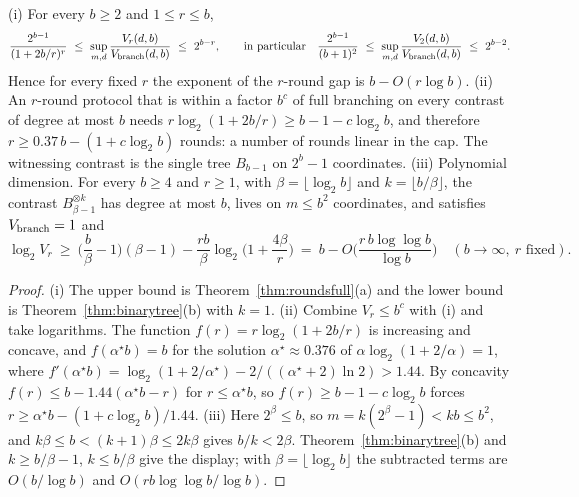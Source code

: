 \begin{corollary}\label{cor:fewrounds}
\textup{(i)} For every $b\ge2$ and $1\le r\le b$,
\[
 \frac{2^{b-1}}{(1+2b/r)^{r}}\ \le\ \sup_{m,d}\frac{V_r(d,b)}{V_{\rm branch}(d,b)}\ \le\ 2^{b-r},
 \qquad\text{in particular}\quad
 \frac{2^{b-1}}{(b+1)^2}\ \le\ \sup_{m,d}\frac{V_2(d,b)}{V_{\rm branch}(d,b)}\ \le\ 2^{b-2}.
\]
Hence for every fixed $r$ the exponent of the $r$-round gap is $b-O(r\log b)$.
\textup{(ii)} An $r$-round protocol that is within a factor $b^{c}$ of full
branching on every contrast of degree at most $b$ needs
$r\log_2(1+2b/r)\ge b-1-c\log_2b$, and therefore $r\ge0.37\,b-(1+c\log_2b)$
rounds: a number of rounds linear in the cap. The witnessing contrast is the
single tree $B_{b-1}$ on $2^b-1$ coordinates.
\textup{(iii)} Polynomial dimension. For every $b\ge4$ and $r\ge1$, with
$\beta=\lfloor\log_2b\rfloor$ and $k=\lfloor b/\beta\rfloor$, the contrast
$B_{\beta-1}^{\otimes k}$ has degree at most $b$, lives on $m\le b^2$
coordinates, and satisfies $V_{\rm branch}=1$ and
\[
 \log_2V_r\ \ge\ \Big(\frac b\beta-1\Big)(\beta-1)-\frac{rb}{\beta}\log_2\Big(1+\frac{4\beta}{r}\Big)
 \ =\ b-O\Big(\frac{r\,b\log\log b}{\log b}\Big)\quad(b\to\infty,\ r\text{ fixed}).
\]
\end{corollary}
\begin{proof}
(i) The upper bound is Theorem~\ref{thm:roundsfull}(a) and the lower bound is
Theorem~\ref{thm:binarytree}(b) with $k=1$. (ii) Combine $V_r\le b^c$ with
(i) and take logarithms. The function $f(r)=r\log_2(1+2b/r)$ is increasing
and concave, and $f(\alpha^\star b)=b$ for the solution
$\alpha^\star\approx0.376$ of $\alpha\log_2(1+2/\alpha)=1$, where
$f'(\alpha^\star b)=\log_2(1+2/\alpha^\star)-2/((\alpha^\star+2)\ln2)>1.44$. By
concavity $f(r)\le b-1.44(\alpha^\star b-r)$ for $r\le\alpha^\star b$, so
$f(r)\ge b-1-c\log_2b$ forces
$r\ge\alpha^\star b-(1+c\log_2b)/1.44$. (iii) Here $2^\beta\le b$, so
$m=k(2^\beta-1)<kb\le b^2$, and $k\beta\le b<(k+1)\beta\le2k\beta$ gives
$b/k<2\beta$. Theorem~\ref{thm:binarytree}(b) and $k\ge b/\beta-1$,
$k\le b/\beta$ give the display; with $\beta=\lfloor\log_2b\rfloor$ the
subtracted terms are $O(b/\log b)$ and $O(rb\log\log b/\log b)$.
\end{proof}

